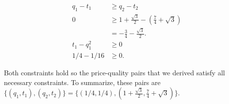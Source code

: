 \documentclass[11pt]{article} %
\begin{document}
\begin{align*}
q_1 - t_1 &\geq q_2 - t_2\\
0&\geq 1 + \frac{\sqrt{3}}{2} -\left(\frac{7}{4} + \sqrt{3}\right)\\
&= -\frac{3}{4} - \frac{\sqrt{3}}{2}.\\
t_1 - q_1^2 &\geq 0\\
 1/4 - 1/16 &\geq 0.
\end{align*}

Both constraints hold so the price-quality pairs that we derived satisfy all necessary constraints. To summarize, these pairs are $\{(q_1,t_1),(q_2,t_2)\} = \{ (1/4,1/4),(1 + \frac{\sqrt{3}}{2},\frac{7}{4} + \sqrt{3})\}$.
\end{document}
